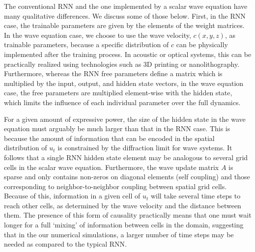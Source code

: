 The conventional RNN and the one implemented by a scalar wave equation have many qualitative differences.
We discuss some of those below. 
First, in the RNN case, the trainable parameters are given by the elements of the weight matrices.  
In the wave equation case, we choose to use the wave velocity, $c(x,y,z)$, as trainable parameters, because a specific distribution of $c$ can be physically implemented after the training process.  
In acoustic or optical systems, this can be practically realized using technologies such as 3D printing or nanolithography. 
Furthermore, whereas the RNN free parameters define a matrix which is multiplied by the input, output, and hidden state vectors, in the wave equation case, the free parameters are multiplied element-wise with the hidden state, which limits the influence of each individual parameter over the full dynamics.  


For a given amount of expressive power, the size of the hidden state in the wave equation must arguably be much larger than that in the RNN case.  This is because the amount of information that can be encoded in the spatial distribution of $u_t$ is constrained by the diffraction limit for wave systems.  It follows that a single RNN hidden state element may be analogous to several grid cells in the scalar wave equation. Furthermore, the wave update matrix $A$ is sparse and only contains non-zeros on diagonal elements (self coupling) and those corresponding to neighbor-to-neighbor coupling between spatial grid cells.  Because of this, information in a given cell of $u_t$ will take several time steps to reach other cells, as determined by the wave velocity and the distance between them.  The presence of this form of causality practically means that one must wait longer for a full `mixing' of information between cells in the domain, suggesting that in the our numerical simulations, a larger number of time steps may be needed as compared to the typical RNN. 


